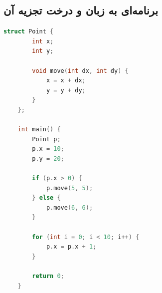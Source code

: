 \documentclass[12pt, a4paper]{report}
\begin{document}
\subsection{برنامه‌ای به زبان  و درخت تجزیه آن}
\LTR
\begin{lstlisting}[language=C++]
	struct Point {
		int x;
		int y;
		
		void move(int dx, int dy) {
			x = x + dx;
			y = y + dy;
		}
	};
	
	int main() {
		Point p;
		p.x = 10;
		p.y = 20;
		
		if (p.x > 0) {
			p.move(5, 5);
		} else {
			p.move(6, 6);
		}
		
		for (int i = 0; i < 10; i++) {
			p.x = p.x + 1;
		}
		
		return 0;
	}
\end{lstlisting}
\RTL
\end{document}
